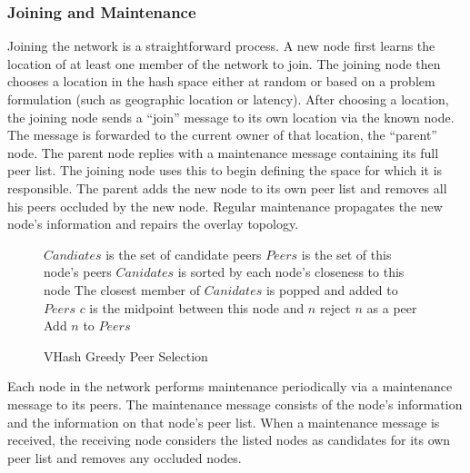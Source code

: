 \documentclass{article}
\begin{document}
\subsubsection*{Joining and Maintenance}
Joining the network is a straightforward process. A new node first learns the location of at least one member of the network to join. The joining node then chooses a location in the hash space either at random or based on a problem formulation (such as geographic location or latency).
After choosing a location, the joining node sends a ``join'' message to its own location via the known node.
The message is forwarded to the current owner of that location, the ``parent'' node.
The parent node replies with a maintenance message containing its full peer list. The joining node uses this to begin defining the space for which it is responsible. 
The parent adds the new node to its own peer list and removes all his peers occluded by the new node.  Regular maintenance propagates the new node's information and repairs the overlay topology. 



\begin{figure}
\begin{minipage}{0.5\textwidth}
\vspace{-25pt}
\begin{algorithm}[H]
\caption{VHash Greedy Peer Selection}
\label{peer}
{\footnotesize

\begin{algorithmic}[1]  %
	\STATE $Candiates$ is the set of candidate peers
    \STATE $Peers$ is the set of this node's peers
    \STATE $Canidates$ is sorted by each node's closeness to this node
    \STATE The closest member of $Canidates$ is popped and added to $Peers$
    	\STATE $c$ is the midpoint between this node and $n$
        	\STATE reject $n$ as a peer
        \ELSE
        	\STATE Add $n$ to $Peers$
        \ENDIF
    \ENDFOR
\end{algorithmic}
}
\end{algorithm}
\vspace{-30pt}
    \end{minipage}
  \end{figure}


Each node in the network performs maintenance periodically via a maintenance message to its peers. The maintenance message consists of the node's information and the information on that node's peer list. When a maintenance message is received, the receiving node considers the listed nodes as candidates for its own peer list and removes any occluded nodes. 
\end{document}
